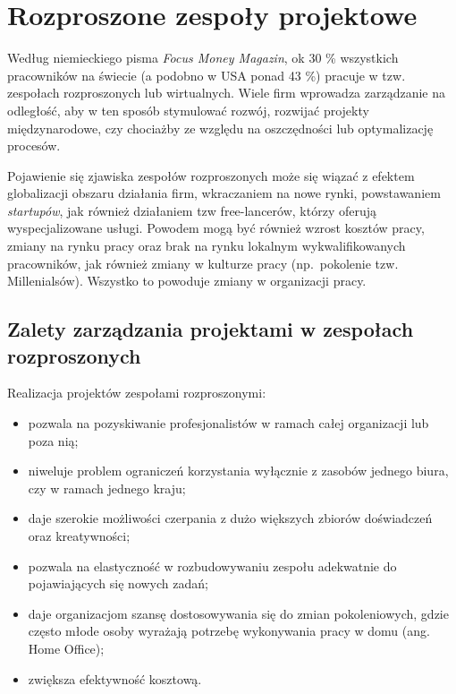 
\chapter{Rozproszone zespoły projektowe}

Według niemieckiego pisma \textit{Focus Money Magazin},
ok 30 \% wszystkich pracowników na świecie (a podobno w USA ponad 43 \%) pracuje w tzw.
zespołach rozproszonych lub wirtualnych.
Wiele firm wprowadza zarządzanie na odległość, aby w ten sposób stymulować rozwój,
rozwijać projekty międzynarodowe, czy chociażby ze względu na oszczędności lub optymalizację procesów.

Pojawienie się zjawiska zespołów rozproszonych może się wiązać z efektem globalizacji obszaru działania firm,
wkraczaniem na nowe rynki, powstawaniem \textit{startupów}, jak również działaniem tzw free-lancerów,
którzy oferują wyspecjalizowane usługi.
Powodem mogą być również wzrost kosztów pracy, zmiany na rynku pracy oraz brak na rynku lokalnym
wykwalifikowanych pracowników, jak również zmiany w kulturze pracy
(np.\ pokolenie tzw. Millenialsów). Wszystko to powoduje zmiany w organizacji pracy.

\section{Zalety zarządzania projektami w zespołach rozproszonych}

Realizacja projektów zespołami rozproszonymi:

\begin{itemize}
	\item pozwala na pozyskiwanie profesjonalistów w ramach całej organizacji lub poza nią;
	\item niweluje problem ograniczeń korzystania wyłącznie z zasobów jednego biura, czy w ramach jednego kraju;
	\item daje szerokie możliwości czerpania z dużo większych zbiorów doświadczeń oraz kreatywności;
	\item pozwala na elastyczność w rozbudowywaniu zespołu adekwatnie do pojawiających się nowych zadań;
	\item daje organizacjom szansę dostosowywania się do zmian pokoleniowych,
	gdzie często młode osoby wyrażają potrzebę wykonywania pracy w domu (ang. Home Office);
	\item zwiększa efektywność kosztową.
\end{itemize}

